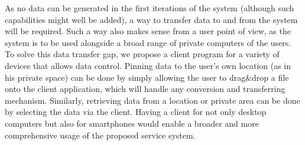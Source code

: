 As no data can be generated in the first iterations of the system (although such capabilities might well be added), a way to transfer data to and from the system will be required.
Such a way also makes sense from a user point of view, as the system is to be used alongside a broad range of private computers of the users.
To solve this data transfer gap, we propose a client program for a variety of devices that allows data control.
Pinning data to the user's own location (as in his private space) can be done by simply allowing the user to drag\&drop a file onto the client application, which will handle any conversion and transferring mechanism.
Similarly, retrieving data from a location or private area can be done by selecting the data via the client.
Having a client for not only desktop computers but also for smartphones would enable a broader and more comprehensive usage of the proposed service system.
